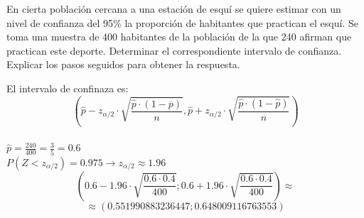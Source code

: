 \documentclass[addpoints,spanish, 12pt,a4paper]{exam}
\renewcommand*\half{.5}
\begin{document}
\begin{questions}
\question[2\half] En cierta población cercana a una estación de esquí se quiere estimar con un nivel de confianza del 95\% la proporción de habitantes que practican el esquí. Se toma una muestra de 400 habitantes de la población de la que 240 afirman que practican este deporte. Determinar el correspondiente intervalo de confianza. Explicar los pasos seguidos para obtener la respuesta.
\begin{solution}
 El intervalo de confinaza es:
    $$ \left( \widehat{p} - z_{\alpha / 2}\cdot \sqrt{\frac{\widehat{p}\cdot\left(1-\overline{p} \right)}{n}} ,  \widehat{p} + z_{\alpha / 2}\cdot \sqrt{\frac{\widehat{p}\cdot\left(1-\widehat{p} \right)}{n}}\right)$$ \\
    $\widehat{p}=\frac{240}{400}=\frac{3}{5}=0.6$ \\
    $P(Z<z_{\alpha/2}) = 0.975  \to z_{\alpha/2}\approx 1.96$ \\
    $$\left(0.6 - 1.96\cdot\sqrt{\dfrac{0.6 \cdot 0.4}{400}} ; 0.6 + 1.96\cdot\sqrt{\dfrac{0.6 \cdot 0.4}{400}} \right)\approx$$$$\approx(0.551990883236447; 0.648009116763553)$$
    
\end{solution}







\end{questions}
\end{document}
